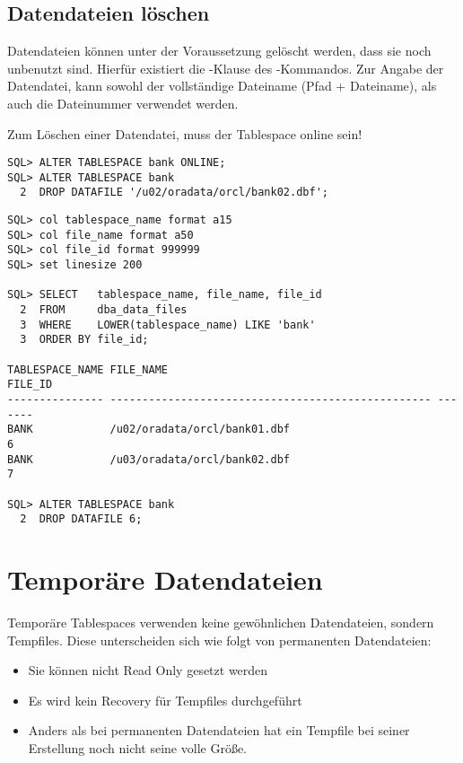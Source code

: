       \subsection{Datendateien l\"oschen}
        Datendateien k\"onnen unter der Voraussetzung gel\"oscht werden, dass sie noch unbenutzt sind. Hierf\"ur existiert die -Klause des -Kommandos. Zur Angabe der Datendatei, kann sowohl der vollst\"andige Dateiname (Pfad + Dateiname), als auch die Dateinummer verwendet werden.
        \begin{merke}
          Zum L\"oschen einer Datendatei, muss der Tablespace online sein!
        \end{merke}
        \begin{lstlisting}[caption={Eine Datendatei l\"oschen},label=admin129,language=oracle_sql]
SQL> ALTER TABLESPACE bank ONLINE;
SQL> ALTER TABLESPACE bank
  2  DROP DATAFILE '/u02/oradata/orcl/bank02.dbf';
        \end{lstlisting}
        \begin{lstlisting}[caption={Benutzen der Dateinummer zum l\"oschen einer Datendatei},label=admin130,language=oracle_sql,alsolanguage=sqlplus]
SQL> col tablespace_name format a15
SQL> col file_name format a50
SQL> col file_id format 999999
SQL> set linesize 200

SQL> SELECT   tablespace_name, file_name, file_id
  2  FROM     dba_data_files
  3  WHERE    LOWER(tablespace_name) LIKE 'bank'
  3  ORDER BY file_id;

TABLESPACE_NAME FILE_NAME                                          FILE_ID
--------------- -------------------------------------------------- -------
BANK            /u02/oradata/orcl/bank01.dbf                             6
BANK            /u03/oradata/orcl/bank02.dbf                             7

SQL> ALTER TABLESPACE bank
  2  DROP DATAFILE 6;
        \end{lstlisting}
    \section{Tempor\"are Datendateien}
      Tempor\"are Tablespaces verwenden keine gew\"ohnlichen Datendateien, sondern Tempfiles. Diese unterscheiden sich wie folgt von permanenten Datendateien:
      \begin{itemize}
        \item Sie k\"onnen nicht Read Only gesetzt werden
        \item Es wird kein Recovery f\"ur Tempfiles durchgef\"uhrt
        \item Anders als bei permanenten Datendateien hat ein Tempfile bei seiner Erstellung noch nicht seine volle Gr\"o\ss{}e.
      \end{itemize}

